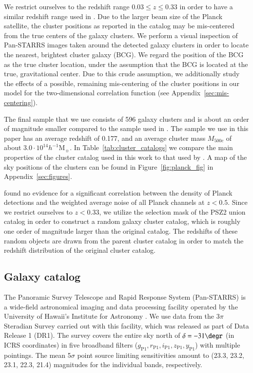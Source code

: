 \documentclass[iop, apjl, twocolappendix, numberedappendix]{emulateapj}
\begin{document}
We restrict ourselves to the redshift range $0.03 \leq z \leq 0.33$ in
order to have a similar redshift range used in
\citet{more2016detection}. Due to the larger beam size of the Planck
satellite, the cluster positions as reported in the catalog may be
mis-centered from the true centers of the galaxy clusters. We perform
a visual inspection of Pan-STARRS images taken around the detected
galaxy clusters in order to locate the nearest, brightest cluster
galaxy (BCG). We regard the position of the BCG as the true cluster
location, under the assumption that the BCG is located at the true,
gravitational center. Due to this crude assumption, we additionally 
study the effects of a possible, remaining mis-centering of the 
cluster positions in our model for the two-dimensional correlation 
function (see Appendix~\ref{sec:mis-centering}). 

The final sample that we use consists of 596
galaxy clusters and is about an order of magnitude smaller compared
to the sample used in \citet{more2016detection}. The sample we use
in this paper has an average redshift of 0.177, and an average
cluster mass $M_{500c}$ of about $3.0 \cdot 10^{14}
h^{-1}$M$_{\sun}$. In Table~\ref{tab:cluster_catalogs} we compare
the main properties of the cluster catalog used in this work to that
used by \citet{more2016detection}. A map of the sky positions of the clusters
can be found in Figure~\ref{fig:planck_fig} in
Appendix~\ref{sec:figures}. 

\citet{kosyra2015environment} found no evidence for a significant
correlation between the density of Planck detections and the
weighted average noise of all Planck channels at $z<0.5$. Since we
restrict ourselves to $z<0.33$, we utilize the selection mask of the
PSZ2 union catalog in order to construct a random galaxy cluster
catalog, which is roughly one order of magnitude larger than the
original catalog. The redshifts of these random objects are drawn
from the parent cluster catalog in order to match the redshift
distribution of the original cluster catalog. 

\subsection{Galaxy catalog}
\label{sec:galaxies}
The Panoramic Survey Telescope and Rapid Response System
(Pan-STARRS) is a wide-field astronomical imaging and data
processing facility operated by the University of Hawaii's Institute
for Astronomy \citep{kaiser2002pan,kaiser2010pan}. We use data from
the 3$\pi$ Steradian Survey carried out with this facility, which
was released as part of Data Release 1 (DR1). The survey covers the
entire sky north of $\delta=-31\degr$ (in ICRS coordinates) in five
broadband filters ($g_{\mathrm{P1}}, r_{\mathrm{P1}},
i_{\mathrm{P1}}, z_{\mathrm{P1}}, y_{\mathrm{P1}}$) with multiple
pointings. The mean 5$\sigma$ point source limiting sensitivities
amount to (23.3, 23.2, 23.1, 22.3, 21.4) magnitudes for the
individual bands, respectively. 
\end{document}
